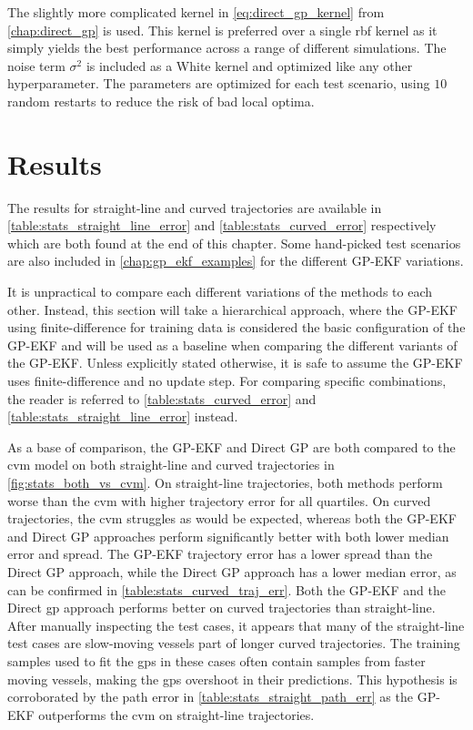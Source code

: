 The slightly more complicated kernel in \cref{eq:direct_gp_kernel} from \cref{chap:direct_gp} is used. This kernel is preferred over a single \acrshort{rbf} kernel as it simply yields the best performance across a range of different simulations. The noise term $\sigma^2$ is included as a White kernel and optimized like any other hyperparameter. The parameters are optimized for each test scenario, using $10$ random restarts to reduce the risk of bad local optima.

\section{Results}
The results for straight-line and curved trajectories are available in \cref{table:stats_straight_line_error} and \cref{table:stats_curved_error} respectively which are both found at the end of this chapter. Some hand-picked test scenarios are also included in \cref{chap:gp_ekf_examples} for the different GP-EKF variations.

It is unpractical to compare each different variations of the methods to each other. Instead, this section will take a hierarchical approach, where the GP-EKF using finite-difference for training data is considered the basic configuration of the GP-EKF and will be used as a baseline when comparing the different variants of the GP-EKF. Unless explicitly stated otherwise, it is safe to assume the GP-EKF uses finite-difference and no update step. For comparing specific combinations, the reader is referred to \cref{table:stats_curved_error} and \cref{table:stats_straight_line_error} instead.

As a base of comparison, the GP-EKF and Direct GP are both compared to the \acrshort{cvm} model on both straight-line and curved trajectories in \cref{fig:stats_both_vs_cvm}. On straight-line trajectories, both methods perform worse than the \acrshort{cvm} with higher trajectory error for all quartiles. On curved trajectories, the \acrshort{cvm} struggles as would be expected, whereas both the GP-EKF and Direct GP approaches perform significantly better with both lower median error and spread. The GP-EKF trajectory error has a lower spread than the Direct GP approach, while the Direct GP approach has a lower median error, as can be confirmed in \cref{table:stats_curved_traj_err}. Both the GP-EKF and the Direct \acrshort{gp} approach performs better on curved trajectories than straight-line. After manually inspecting the test cases, it appears that many of the straight-line test cases are slow-moving vessels part of longer curved trajectories.  The training samples used to fit the \acrshort{gp}s in these cases often contain samples from faster moving vessels, making the \acrshort{gp}s overshoot in their predictions. This hypothesis is corroborated by the path error in \cref{table:stats_straight_path_err} as the GP-EKF outperforms the \acrshort{cvm} on straight-line trajectories.

